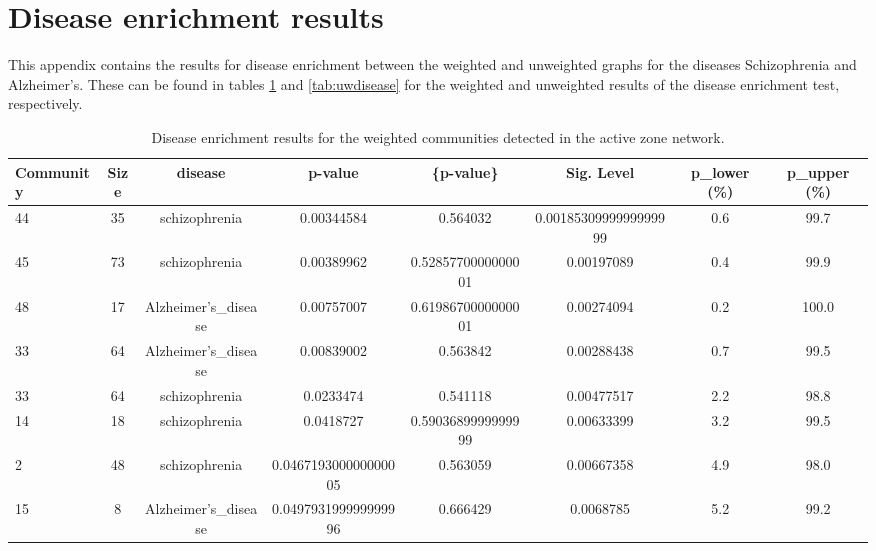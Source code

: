 \section{Disease enrichment results}

This appendix contains the results for disease enrichment between the weighted and unweighted graphs for the diseases Schizophrenia and Alzheimer's.
These can be found in tables \ref{tab:wdisease} and \ref{tab:uwdisease} for the weighted and unweighted results of the disease enrichment test, respectively.

\begin{table}
    \centering
    \begin{tabular}{l c c c c c c c}
        \small
    Community & Size & disease & p-value & \{p-value\} & Sig. Level & p_lower (\%) & p_upper (\%) \\
        \hline
    44 & 35 & schizophrenia & 0.00344584 & 0.564032 & 0.0018530999999999999 & 0.6 & 99.7 \\
    45 & 73 & schizophrenia & 0.00389962 & 0.5285770000000001 & 0.00197089 & 0.4 & 99.9 \\
    48 & 17 & Alzheimer's_disease & 0.00757007 & 0.6198670000000001 & 0.00274094 & 0.2 & 100.0 \\
    33 & 64 & Alzheimer's_disease & 0.00839002 & 0.563842 & 0.00288438 & 0.7 & 99.5 \\
    33 & 64 & schizophrenia & 0.0233474 & 0.541118 & 0.00477517 & 2.2 & 98.8 \\
    14 & 18 & schizophrenia & 0.0418727 & 0.5903689999999999 & 0.00633399 & 3.2 & 99.5 \\
    2 & 48 & schizophrenia & 0.046719300000000005 & 0.563059 & 0.00667358 & 4.9 & 98.0 \\
    15 & 8 & Alzheimer's_disease & 0.049793199999999996 & 0.666429 & 0.0068785 & 5.2 & 99.2 \\
    \end{tabular}
    \caption{Disease enrichment results for the weighted communities detected in the active zone network.}
    \label{tab:wdisease}
\end{table}
    

